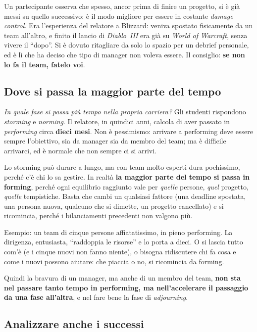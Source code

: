 Un partecipante osserva che spesso, ancor prima di finire un progetto, si è
già messi su quello successivo: è il modo migliore per essere in costante
\emph{damage control}. Era l'esperienza del relatore a Blizzard: veniva
spostato fisicamente da un team all'altro, e finito il lancio di
\emph{Diablo~III} era già su \emph{World of Warcraft}, senza vivere il
``dopo''. Si è dovuto ritagliare da solo lo spazio per un debrief personale,
ed è lì che ha deciso che tipo di manager non voleva essere. Il consiglio:
\textbf{se non lo fa il team, fatelo voi}.

\subsection{Dove si passa la maggior parte del tempo}

\emph{In quale fase si passa più tempo nella propria carriera?} Gli studenti
rispondono \emph{storming} e \emph{norming}. Il relatore, in quindici anni,
calcola di aver passato in \emph{performing} circa \textbf{dieci mesi}. Non è
pessimismo: arrivare a performing deve essere sempre l'obiettivo, sia da
manager sia da membro del team; ma è difficile arrivarci, ed è normale che non
sempre ci si arrivi.

Lo storming può durare a lungo, ma con team molto esperti dura pochissimo,
perché c'è chi lo sa gestire. In realtà \textbf{la maggior parte del tempo si
passa in forming}, perché ogni equilibrio raggiunto vale per \emph{quelle}
persone, \emph{quel} progetto, \emph{quelle} tempistiche. Basta che cambi un
qualsiasi fattore (una deadline spostata, una persona nuova, qualcuno che si
dimette, un progetto cancellato) e si ricomincia, perché i bilanciamenti
precedenti non valgono più.

Esempio: un team di cinque persone affiatatissimo, in pieno performing. La
dirigenza, entusiasta, ``raddoppia le risorse'' e lo porta a dieci. O si
lascia tutto com'è (e i cinque nuovi non fanno niente), o bisogna ridiscutere
chi fa cosa e come i nuovi possono aiutare: che piaccia o no, si ricomincia
da forming.

Quindi la bravura di un manager, ma anche di un membro del team,
\textbf{non sta nel passare tanto tempo in performing, ma nell'accelerare il
passaggio da una fase all'altra}, e nel fare bene la fase di
\emph{adjourning}.

\subsection{Analizzare anche i successi}

